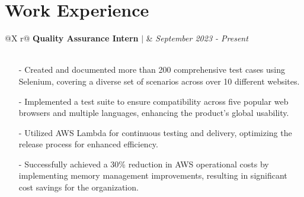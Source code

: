 \documentclass[a4paper,12pt]{article}
\begin{document}

\section{Work Experience}

\begin{tabularx}{\linewidth}{ @{}X r@{} }
    {\textbf{Quality Assurance Intern}} $\vert$ & \textit{September 2023 - Present} \\
     \\
\end{tabularx}

\begin{minipage}{\linewidth}
    \begin{itemize}[nosep,after=\strut, leftmargin=1em]
        \item[-] Created and documented more than 200 comprehensive test cases using Selenium, covering a diverse set of scenarios across over 10 different websites.
        \item[-] Implemented a test suite to ensure compatibility across five popular web browsers and multiple languages, enhancing the product's global usability.
        \item[-] Utilized AWS Lambda for continuous testing and delivery, optimizing the release process for enhanced efficiency.
        \item[-] Successfully achieved a 30\% reduction in AWS operational costs by implementing memory management improvements, resulting in significant cost savings for the organization.

    \end{itemize}
\end{minipage}
\end{document}
